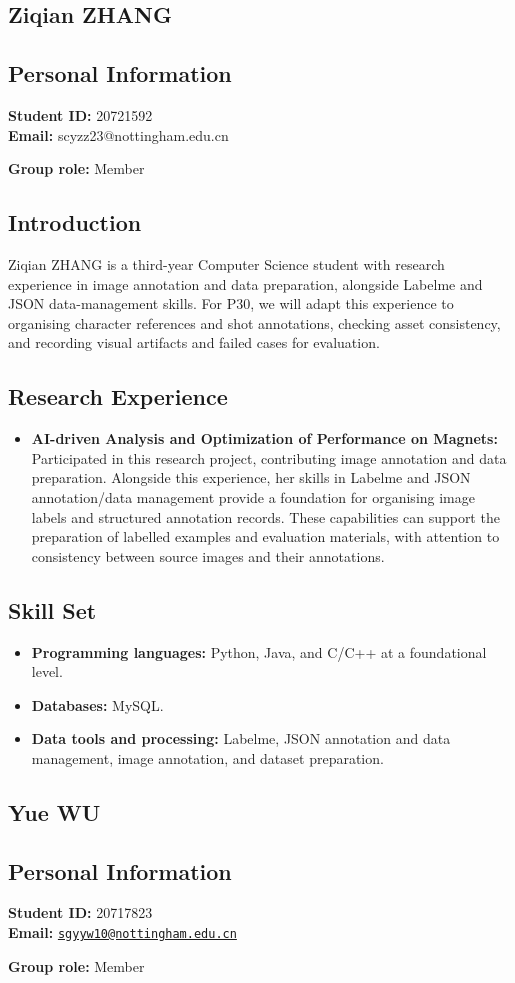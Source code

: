 \documentclass[a4paper,12pt]{article}
\newcommand{\PersonalInformation}[2]{%
  \subsection*{Personal Information}
  \if\relax\detokenize{#1}\relax\else
  \noindent\textbf{Student ID:} #1\\
  \fi
  \textbf{Email:} #2\par
}
\begin{document}
\subsection{Ziqian ZHANG}
\PersonalInformation{20721592}{scyzz23@nottingham.edu.cn}
\noindent\textbf{Group role:} Member\par

\subsection*{Introduction}
Ziqian ZHANG is a third-year Computer Science student with research experience in image annotation and data preparation, alongside Labelme and JSON data-management skills. For P30, we will adapt this experience to organising character references and shot annotations, checking asset consistency, and recording visual artifacts and failed cases for evaluation.

\subsection*{Research Experience}
\begin{itemize}
  \item \textbf{AI-driven Analysis and Optimization of Performance on Magnets:} Participated in this research project, contributing image annotation and data preparation. Alongside this experience, her skills in Labelme and JSON annotation/data management provide a foundation for organising image labels and structured annotation records. These capabilities can support the preparation of labelled examples and evaluation materials, with attention to consistency between source images and their annotations.
\end{itemize}

\subsection*{Skill Set}
\begin{itemize}
  \item \textbf{Programming languages:} Python, Java, and C/C++ at a foundational level.
  \item \textbf{Databases:} MySQL.
  \item \textbf{Data tools and processing:} Labelme, JSON annotation and data management, image annotation, and dataset preparation.
\end{itemize}

\subsection{Yue WU}
\PersonalInformation{20717823}{\href{mailto:sgyyw10@nottingham.edu.cn}{\nolinkurl{sgyyw10@nottingham.edu.cn}}}
\noindent\textbf{Group role:} Member\par
\end{document}
